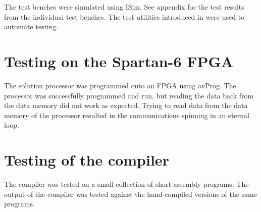 The test benches were simulated using ISim. See appendix  for the test results from the individual test benches. 
The test utilities introduced in \cite{assignment-1} were used to automate testing.

\section{Testing on the Spartan-6 FPGA}

The solution processor was programmed onto an FPGA using avProg.
The processor was successfully programmed and run, but reading the data back from the data memory did not work as expected.
Trying to read data from the data memory of the processor resulted in the communications spinning in an eternal loop.

\section{Testing of the compiler}

The compiler was tested on a small collection of short assembly programs.
The output of the compiler was tested against the hand-compiled versions of the same programs.
